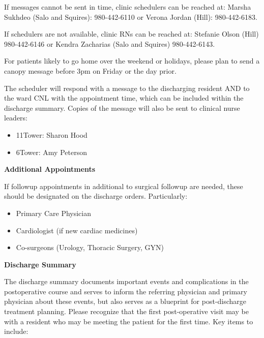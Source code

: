 \documentclass[
]{book}
\providecommand{\tightlist}{%
  \setlength{\itemsep}{0pt}\setlength{\parskip}{0pt}}
\begin{document}
If messages cannot be sent in time, clinic schedulers can be reached at: Marsha Sukhdeo (Salo and Squires): 980-442-6110 or Verona Jordan (Hill): 980-442-6183.

If schedulers are not available, clinic RNs can be reached at: Stefanie Olson (Hill) 980-442-6146 or Kendra Zacharias (Salo and Squires) 980-442-6143.

For patients likely to go home over the weekend or holidays, please plan to send a canopy message before 3pm on Friday or the day prior.

The scheduler will respond with a message to the discharging resident AND to the ward CNL with the appointment time, which can be included within the discharge summary. Copies of the message will also be sent to clinical nurse leaders:

\begin{itemize}
\tightlist
\item
  11Tower: Sharon Hood
\item
  6Tower: Amy Peterson
\end{itemize}

\textbf{Additional Appointments}

If followup appointments in additional to surgical followup are needed, these should be designated on the discharge orders. Particularly:

\begin{itemize}
\tightlist
\item
  Primary Care Physician
\item
  Cardiologist (if new cardiac medicines)
\item
  Co-surgeons (Urology, Thoracic Surgery, GYN)
\end{itemize}

\textbf{Discharge Summary}

The discharge summary documents important events and complications in the postoperative course and serves to inform the referring physician and primary physician about these events, but also serves as a blueprint for post-discharge treatment planning. Please recognize that the first post-operative visit may be with a resident who may be meeting the patient for the first time. Key items to include:
\end{document}
